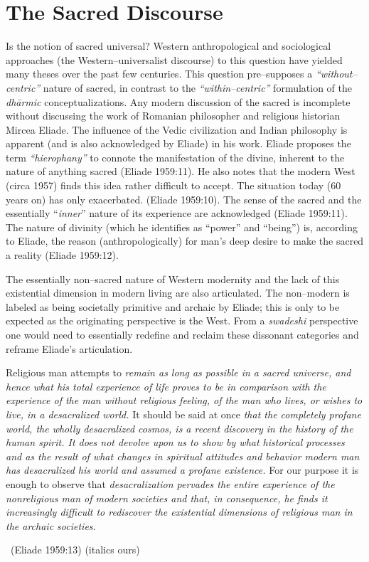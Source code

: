 \section*{The Sacred Discourse}

Is the notion of sacred universal? Western anthropological and sociological approaches (the Western–universalist discourse) to this question have yielded many theses over the past few centuries. This question pre–supposes a \textit{“without–centric”} nature of sacred, in contrast to the \textit{“within–centric”} formulation of the \textit{dhārmic} conceptualizations. Any modern discussion of the sacred is incomplete without discussing the work of Romanian philosopher and religious historian Mircea Eliade. The influence of the Vedic civilization and Indian philosophy is apparent (and is also acknowledged by Eliade) in his work. Eliade proposes the term \textit{“hierophany”} to connote the manifestation of the divine, inherent to the nature of anything sacred (Eliade 1959:11). He also notes that the modern West (circa 1957) finds this idea rather difficult to accept. The situation today (60 years on) has only exacerbated. (Eliade 1959:10). The sense of the sacred and the essentially “\textit{inner}” nature of its experience are acknowledged (Eliade 1959:11). The nature of divinity (which he identifies as “power” and “being”) is, according to Eliade, the reason (anthropologically) for man's deep desire to make the sacred a reality (Eliade 1959:12).

The essentially non–sacred nature of Western modernity and the lack of this existential dimension in modern living are also articulated. The non–modern is labeled as being societally primitive and archaic by Eliade; this is only to be expected as the originating perspective is the West. From a \textit{swadeshi} perspective one would need to essentially redefine and reclaim these dissonant categories and reframe Eliade's articulation.

\begin{myquote}
Religious man attempts to \textit{remain as long as possible in a sacred universe, and hence what his total experience of life proves to be in comparison with the experience of the man without religious feeling, of the man who lives, or wishes to live, in a desacralized world.} It should be said at once \textit{that the completely profane world, the wholly desacralized cosmos, is a recent discovery in the history of the human spirit. It does not devolve upon us to show by what historical processes and as the result of what changes in spiritual attitudes and behavior modern man has desacralized his world and assumed a profane existence.} For our purpose it is enough to observe that \textit{desacralization pervades the entire experience of the nonreligious man of modern societies and that, in consequence, he finds it increasingly difficult to rediscover the existential dimensions of religious man in the archaic societies.} 

~\hfill (Eliade 1959:13) (italics ours)
\end{myquote}


